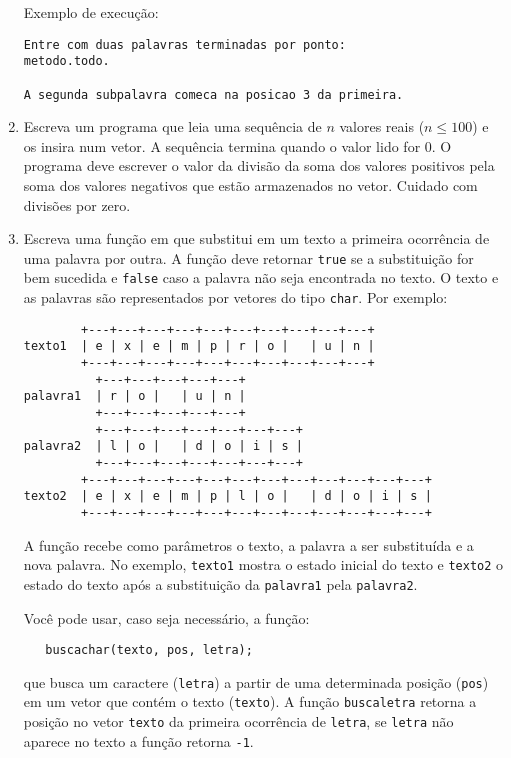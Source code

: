 \begin{enumerate}
\noindent
{Exemplo de execução: }
\small
\begin{verbatim}
Entre com duas palavras terminadas por ponto:
metodo.todo.

A segunda subpalavra comeca na posicao 3 da primeira.
\end{verbatim}



\item Escreva um programa que leia uma sequência de $n$ valores
reais ($n \leq 100$) e os insira num vetor.  A sequência termina quando o
valor lido for 0.  O programa deve escrever o valor da divisão 
da soma dos valores positivos pela soma dos valores
negativos que estão armazenados no vetor. Cuidado com divisões por zero.

\item Escreva uma função em  que substitui em um texto a primeira
ocorrência de  uma   palavra por   outra.  A  função  deve  retornar
\verb+true+ se a subs\-ti\-tui\-ção for bem sucedida e
\verb+false+ caso a palavra  não seja encontrada no  texto.  O texto e
as palavras são  representados  por vetores  do  tipo \verb+char+. Por
exemplo:
\vspace{-0.2cm}
\begin{center}
\begin{small}
\begin{verbatim}
        +---+---+---+---+---+---+---+---+---+---+
texto1  | e | x | e | m | p | r | o |   | u | n |
        +---+---+---+---+---+---+---+---+---+---+
          +---+---+---+---+---+
palavra1  | r | o |   | u | n |
          +---+---+---+---+---+
          +---+---+---+---+---+---+---+
palavra2  | l | o |   | d | o | i | s |
          +---+---+---+---+---+---+---+
        +---+---+---+---+---+---+---+---+---+---+---+---+
texto2  | e | x | e | m | p | l | o |   | d | o | i | s |
        +---+---+---+---+---+---+---+---+---+---+---+---+
\end{verbatim}
\end{small}
\end{center}
\vspace{-0.2cm}
A função recebe como parâmetros o texto, a palavra a ser substituída e
a nova palavra.  No exemplo, \verb+texto1+  mostra o estado inicial do
texto  e \verb+texto2+  o   estado do texto  após  a   substituição da
\verb+palavra1+ pela \verb+palavra2+.

Você pode usar, caso seja necessário, a função:
\begin{center}
\begin{small}
\begin{verbatim}
   buscachar(texto, pos, letra);
\end{verbatim}
\end{small}
\end{center}
que busca  um  caractere (\verb+letra+) a  partir   de uma determinada
posição (\verb+pos+) em um vetor que  contém o texto (\verb+texto+). A
função \verb+buscaletra+  retorna a posição  no  vetor \verb+texto+ da
primeira ocorrência  de  \verb+letra+, se \verb+letra+  não aparece no
texto a função retorna \verb+-1+.


\end{enumerate}
